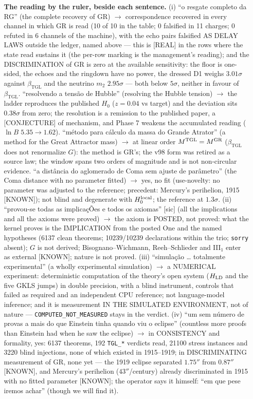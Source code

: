 \documentclass[11pt]{article}
\newcommand{\bTGL}{\beta_{\mathrm{TGL}}}\newcommand{\Msun}{M_{\odot}}\newcommand{\TGL}{\mathrm{TGL}}
\theoremstyle{definition}\newtheorem{deriv}{Derivation}
\begin{document}
\textbf{The reading by the ruler, beside each sentence.} (i) ``o resgate completo da RG'' (the complete recovery of GR) $\to$ correspondence recovered in every channel in which GR is read (10 of 10 in the table; 0 falsified in 11 charges; 0 refuted in 6 channels of the machine), with the echo pairs falsified AS DELAY LAWS outside the ledger, named above --- this is \textsf{[REAL]} in the rows where the state read sustains it (the per-row marking is the management's reading); and the DISCRIMINATION of GR is zero at the available sensitivity: the floor is one-sided, the echoes and the ringdown have no power, the dressed D1 weighs $3.01\sigma$ against $\bTGL$ and the neutrino $m_2$ $2.95\sigma$ --- both below $5\sigma$, neither in favour of $\bTGL$. ``resolvendo a tensão de Hubble'' (resolving the Hubble tension) $\to$ the ladder reproduces the published $H_0$ ($z=0.04$ vs target) and the deviation sits $0.38\sigma$ from zero; the resolution is a remission to the published paper, a \textsf{[CONJECTURE]} of mechanism, and Phase 7 weakens the accumulated reading ($\ln B$ $5.35\to1.62$). ``método para cálculo da massa do Grande Atrator'' (a method for the Great Attractor mass) $\to$ at linear order $M^{\rm TGL}=M^{\rm GR}$ ($\bTGL$ does not renormalize $G$): the method is GR's; the v98 form was retired as a source law; the window spans two orders of magnitude and is not non-circular evidence. ``a distância do aglomerado de Coma sem ajuste de parâmetro'' (the Coma distance with no parameter fitted) $\to$ yes, no fit (use-novelty: no parameter was adjusted to the reference; precedent: Mercury's perihelion, 1915 \textsf{[KNOWN]}); not blind and degenerate with $H_0^{\rm local}$; the reference at $1.3\sigma$. (ii) ``provou-se todas as implicaçÕes e todos os axiomas'' [sic] (all the implications and all the axioms were proved) $\to$ the axiom is POSTED, not proved: what the kernel proves is the IMPLICATION from the posted One and the named hypotheses (6137 clean theorems; 10239/10239 declarations within the trio; \texttt{sorry} absent); $G$ is not derived; Bisognano--Wichmann, Reeh--Schlieder and III$_1$ enter as external \textsf{[KNOWN]}; nature is not proved. (iii) ``simulação … totalmente experimental'' (a wholly experimental simulation) $\to$ a NUMERICAL experiment: deterministic computation of the theory's open system ($H_{\rm LD}$ and the five GKLS jumps) in double precision, with a blind instrument, controls that failed as required and an independent CPU reference; not language-model inference; and it is measurement IN THE SIMULATED ENVIRONMENT, not of nature --- \texttt{COMPUTED\_NOT\_MEASURED} stays in the verdict. (iv) ``um sem número de provas a mais do que Einstein tinha quando viu o eclipse'' (countless more proofs than Einstein had when he saw the eclipse) $\to$ in CONSISTENCY and formality, yes: 6137 theorems, 192 \texttt{TGL\_*} verdicts read, 21100 stress instances and 3220 blind injections, none of which existed in 1915--1919; in DISCRIMINATING measurement of GR, none yet --- the 1919 eclipse separated $1.75''$ from $0.87''$ \textsf{[KNOWN]}, and Mercury's perihelion ($43''$/century) already discriminated in 1915 with no fitted parameter \textsf{[KNOWN]}; the operator says it himself: ``em que pese iremos achar'' (though we will find it).
\end{document}
